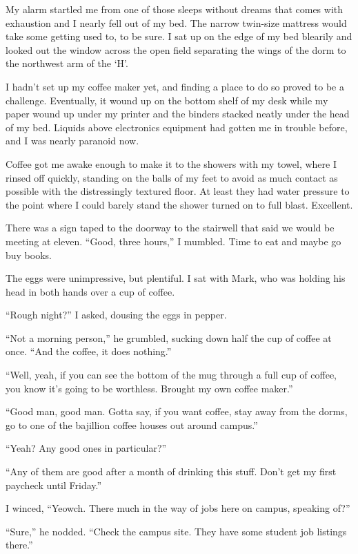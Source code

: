 My alarm startled me from one of those sleeps without dreams that comes with exhaustion and I nearly fell out of my bed.  The narrow twin-size mattress would take some getting used to, to be sure.  I sat up on the edge of my bed blearily and looked out the window across the open field separating the wings of the dorm to the northwest arm of the `H'.

I hadn't set up my coffee maker yet, and finding a place to do so proved to be a challenge.  Eventually, it wound up on the bottom shelf of my desk while my paper wound up under my printer and the binders stacked neatly under the head of my bed.  Liquids above electronics equipment had gotten me in trouble before, and I was nearly paranoid now.

Coffee got me awake enough to make it to the showers with my towel, where I rinsed off quickly, standing on the balls of my feet to avoid as much contact as possible with the distressingly textured floor.  At least they had water pressure to the point where I could barely stand the shower turned on to full blast.  Excellent.

There was a sign taped to the doorway to the stairwell that said we would be meeting at eleven.  ``Good, three hours,'' I mumbled.  Time to eat and maybe go buy books.

The eggs were unimpressive, but plentiful.  I sat with Mark, who was holding his head in both hands over a cup of coffee.

``Rough night?'' I asked, dousing the eggs in pepper.

``Not a morning person,'' he grumbled, sucking down half the cup of coffee at once.  ``And the coffee, it does nothing.''

``Well, yeah, if you can see the bottom of the mug through a full cup of coffee, you know it's going to be worthless.  Brought my own coffee maker.''

``Good man, good man.  Gotta say, if you want coffee, stay away from the dorms, go to one of the bajillion coffee houses out around campus.''

``Yeah?  Any good ones in particular?''

``Any of them are good after a month of drinking this stuff.  Don't get my first paycheck until Friday.'' 

I winced, ``Yeowch.  There much in the way of jobs here on campus, speaking of?''

``Sure,'' he nodded.  ``Check the campus site.  They have some student job listings there.''

